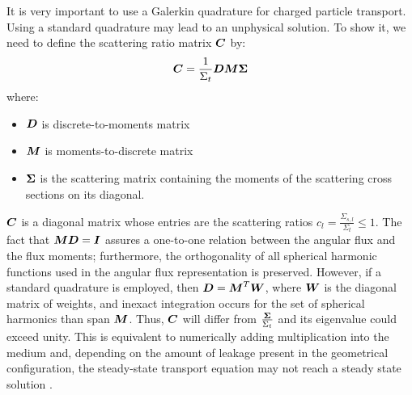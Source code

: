 It is very important to use a Galerkin quadrature for charged particle
transport. Using a standard quadrature may lead to an unphysical solution. To
show it, we need to define the scattering ratio matrix $\boldsymbol{C}$ by:
\begin{equation}
\boldsymbol{C} = \frac{1}{\Sigma_t}\boldsymbol{D}\boldsymbol{M}\boldsymbol{\Sigma}
\end{equation}
where:
\begin{itemize}
\item $\boldsymbol{D}$ is discrete-to-moments matrix
\item $\boldsymbol{M}$ is moments-to-discrete matrix
\item $\boldsymbol{\Sigma}$ is the scattering matrix containing the moments of the
  scattering cross sections on its diagonal.
\end{itemize}
$\boldsymbol{C}$ is a diagonal matrix whose entries are the scattering ratios
$c_l=\frac{\Sigma_{s,l}}{\Sigma_t} \leq 1$. The fact that $\boldsymbol{MD}=\boldsymbol{I}$
assures a one-to-one relation between the angular flux and the flux moments;
furthermore, the orthogonality of all spherical harmonic functions used in the
angular flux representation is preserved. However, if a standard quadrature is
employed, then $\boldsymbol{D} = \boldsymbol{M}^T \boldsymbol{W}$, where $\boldsymbol{W}$ is the diagonal
matrix of weights, and inexact integration occurs for the set of spherical
harmonics than span $\boldsymbol{M}$. Thus, $\boldsymbol{C}$ will differ from
$\frac{\boldsymbol{\Sigma}}{\Sigma_t}$ and its eigenvalue could exceed unity. This is
equivalent to numerically adding multiplication into the medium and, depending
on the amount of leakage present in the geometrical configuration, the
steady-state transport equation may not reach a steady state solution
\cite{pautz_fp}.

